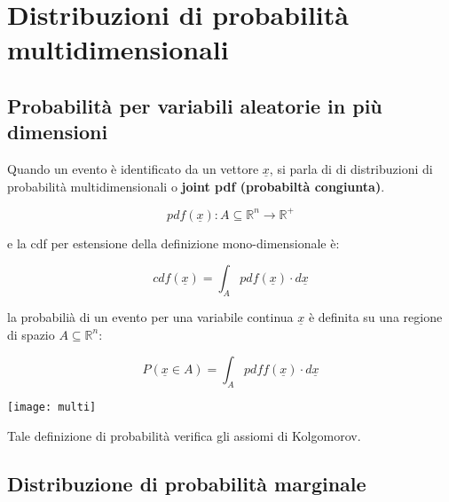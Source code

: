 \setcounter{chapter}{2}
  	\chapter{Distribuzioni di probabilit\`{a} multidimensionali}
  	
  	\section{Probabilit\`{a} per variabili aleatorie in pi\`{u} \\ dimensioni}
  	
  	Quando un evento \`{e} identificato da un vettore $\underline{x}$, si parla di di distribuzioni di probabilit\`{a} multidimensionali o \textbf{joint pdf (probabilt\`{a} congiunta)}.  
  	
  	\begin{equation*}
  		pdf(\underline{x}): A \subseteq \mathbb{R}^n \rightarrow \mathbb{R}^+
  	\end{equation*}
  	
  	e la cdf per estensione della definizione mono-dimensionale \`{e}:
  	
	\begin{equation*}
  		cdf(\underline{x}) = \int_{A}pdf(\underline{x}) \cdot d\underline{x}
	\end{equation*}
  	
  	
	la probabili\`{a} di un evento per una variabile continua $\underline{x}$ \`{e} definita su una regione di spazio $A \subseteq \mathbb{R}^n$:
  	
	\vspace{0.2in}
  \begin{minipage}{0.5\textwidth}
		\begin{equation*}
  			P(\underline{x} \in A) = \int_{A}pdff(\underline{x}) \cdot d\underline{x}
  		\end{equation*}
  \end{minipage}
  \begin{minipage}{.4\textwidth}
    \centering
    \texttt{[image: multi]}

  \end{minipage}
	\vspace{0.2in}

Tale definizione di probabilit\`{a} verifica gli assiomi di Kolgomorov.
	
\section{Distribuzione di probabilit\`{a} marginale}

